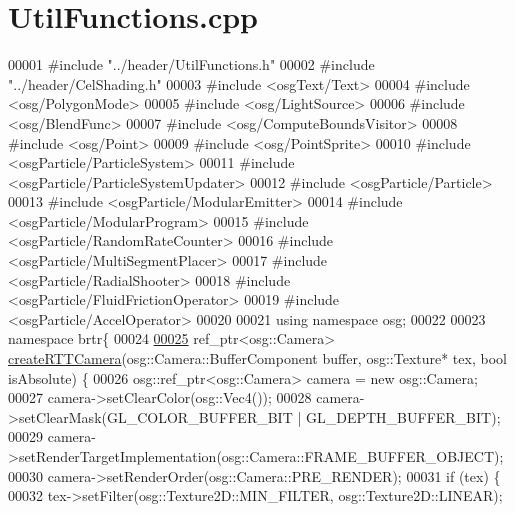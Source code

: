 \hypertarget{_util_functions_8cpp_source}{\section{Util\+Functions.\+cpp}
\label{_util_functions_8cpp_source}
}

\begin{DoxyCode}
00001 \textcolor{preprocessor}{#include "../header/UtilFunctions.h"}
00002 \textcolor{preprocessor}{#include "../header/CelShading.h"}
00003 \textcolor{preprocessor}{#include <osgText/Text>}
00004 \textcolor{preprocessor}{#include <osg/PolygonMode>}
00005 \textcolor{preprocessor}{#include <osg/LightSource>}
00006 \textcolor{preprocessor}{#include <osg/BlendFunc>}
00007 \textcolor{preprocessor}{#include <osg/ComputeBoundsVisitor>}
00008 \textcolor{preprocessor}{#include <osg/Point>}
00009 \textcolor{preprocessor}{#include <osg/PointSprite>}
00010 \textcolor{preprocessor}{#include <osgParticle/ParticleSystem>}
00011 \textcolor{preprocessor}{#include <osgParticle/ParticleSystemUpdater>}
00012 \textcolor{preprocessor}{#include <osgParticle/Particle>}
00013 \textcolor{preprocessor}{#include <osgParticle/ModularEmitter>}
00014 \textcolor{preprocessor}{#include <osgParticle/ModularProgram>}
00015 \textcolor{preprocessor}{#include <osgParticle/RandomRateCounter>}
00016 \textcolor{preprocessor}{#include <osgParticle/MultiSegmentPlacer>}
00017 \textcolor{preprocessor}{#include <osgParticle/RadialShooter>}
00018 \textcolor{preprocessor}{#include <osgParticle/FluidFrictionOperator>}
00019 \textcolor{preprocessor}{#include <osgParticle/AccelOperator>}
00020 
00021 \textcolor{keyword}{using namespace }osg;
00022 
00023 \textcolor{keyword}{namespace }brtr\{
00024   
\hypertarget{_util_functions_8cpp_source_l00025}{}\hyperlink{namespacebrtr_aa7a89c381be095a7eb1e248d2e6c0e23}{00025}     ref\_ptr<osg::Camera> \hyperlink{namespacebrtr_aa7a89c381be095a7eb1e248d2e6c0e23}{createRTTCamera}(osg::Camera::BufferComponent buffer, osg::Texture* 
      tex, \textcolor{keywordtype}{bool} isAbsolute) \{
00026         osg::ref\_ptr<osg::Camera> camera = \textcolor{keyword}{new} osg::Camera;
00027         camera->setClearColor(osg::Vec4());
00028         camera->setClearMask(GL\_COLOR\_BUFFER\_BIT | GL\_DEPTH\_BUFFER\_BIT);
00029         camera->setRenderTargetImplementation(osg::Camera::FRAME\_BUFFER\_OBJECT);
00030         camera->setRenderOrder(osg::Camera::PRE\_RENDER);
00031         \textcolor{keywordflow}{if} (tex) \{
00032             tex->setFilter(osg::Texture2D::MIN\_FILTER, osg::Texture2D::LINEAR);

\end{DoxyCode}
